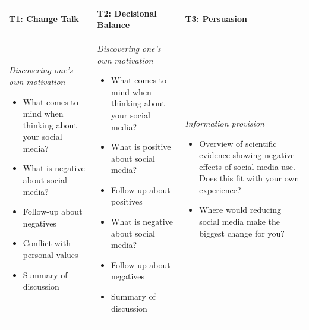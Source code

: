 \begin{tabularx}{\textwidth}{
  >{\raggedright\arraybackslash}X
  >{\raggedright\arraybackslash}X
  >{\raggedright\arraybackslash}X}
\toprule
\textbf{T1: Change Talk} & \textbf{T2: Decisional Balance} & \textbf{T3: Persuasion} \\
\midrule
\begin{minipage}[t]{\linewidth}\vspace{0pt}
\textit{Discovering one’s own motivation}
\begin{itemize}[leftmargin=*,nosep]
\item What comes to mind when thinking about your social media?
\item What is negative about social media?
\item Follow-up about negatives
\item Conflict with personal values
\item Summary of discussion
\end{itemize}
\end{minipage}
\vspace{-0.5em}
&
\begin{minipage}[t]{\linewidth}\vspace{0pt}
\textit{Discovering one’s own motivation}
\begin{itemize}[leftmargin=*,nosep]
\item What comes to mind when thinking about your social media?
\item What is positive about social media?
\item Follow-up about positives
\item What is negative about social media?
\item Follow-up about negatives
\item Summary of discussion
\end{itemize}
\end{minipage}
\vspace{-0.5em}
&
\begin{minipage}[t]{\linewidth}\vspace{0pt}
\textit{Information provision}
\begin{itemize}[leftmargin=*,nosep]
\item Overview of scientific evidence showing negative effects of social media use. Does this fit with your own experience?
\item Where would reducing social media make the biggest change for you?\end{itemize}
\end{minipage}
\vspace{-0.5em}
\\


\end{tabularx}
